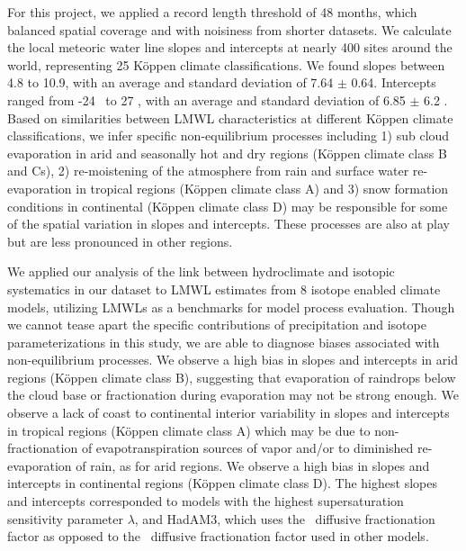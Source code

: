 \documentclass[draft, linenumbers]{agujournal2018}
\begin{document}
For this project, we applied a record length threshold of 48 months, which balanced spatial coverage and with noisiness from shorter datasets.  We calculate the local meteoric water line slopes and intercepts at nearly 400 sites around the world, representing 25 K{\"o}ppen climate classifications. We found slopes between 4.8 to 10.9, with an average and standard deviation of 7.64 $\pm$ 0.64. Intercepts ranged from -24 \textperthousand\ to 27 \textperthousand, with an average and standard deviation of 6.85 $\pm$ 6.2 \textperthousand. Based on similarities between LMWL characteristics at different K{\"o}ppen climate classifications, we infer specific non-equilibrium processes including 1) sub cloud evaporation in arid and seasonally hot and dry regions (K{\"o}ppen climate class B and Cs), 2) re-moistening of the atmosphere from rain and surface water re-evaporation in tropical regions (K{\"o}ppen climate class A) and 3) snow formation conditions in continental (K{\"o}ppen climate class D) may be responsible for some of the spatial variation in slopes and intercepts. These processes are also at play but are less pronounced in other regions. 

We applied our analysis of the link between hydroclimate and isotopic systematics in our dataset to LMWL estimates from 8 isotope enabled climate models, utilizing LMWLs as a benchmarks for model process evaluation. Though we cannot tease apart the specific contributions of precipitation and isotope parameterizations in this study, we are able to diagnose biases associated with non-equilibrium processes. We observe a high bias in slopes and intercepts in arid regions (K{\"o}ppen climate class B), suggesting that evaporation of raindrops below the cloud base or fractionation during evaporation may not be strong enough. We observe a lack of coast to continental interior variability in slopes and intercepts in tropical regions (K{\"o}ppen climate class A) which may be due to non-fractionation of evapotranspiration sources of vapor and/or to diminished re-evaporation of rain, as for arid regions. We observe a high bias in slopes and intercepts in continental regions (K{\"o}ppen climate class D).  The highest slopes and intercepts corresponded to models with the highest supersaturation sensitivity parameter $\lambda$, and HadAM3, which uses the~\citet{Cappa2003} diffusive fractionation factor as opposed to the~\citet{Merlivat1979} diffusive fractionation factor used in other models.
\end{document}
